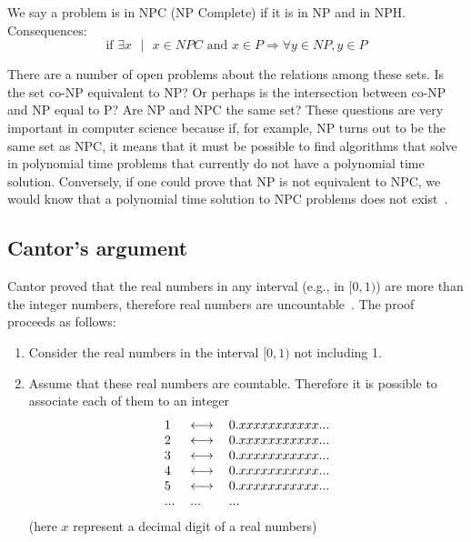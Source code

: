 \documentclass[justified,sixbynine]{tufte-book}
\theoremstyle{plain}%
\theoremstyle{definition}
\theoremstyle{remark}
\begin{document}
\begin{fullwidth}
We say a problem is in NPC (NP Complete) if it is in NP and in NPH.
Consequences:
\begin{equation}
\text{if }\exists x\text{ }|\text{ }x\in NPC\text{ and }x\in P\Rightarrow
\forall y\in NP,y\in P
\end{equation}

There are a number of open problems about the relations among these sets.
Is the set co-NP equivalent to NP? Or perhaps is the intersection between co-NP and NP equal to P?
Are NP and NPC the same set? These questions are very important in computer science because if, for example, NP turns out to be the same set as NPC, it means that it must be possible to find algorithms that solve in polynomial time problems that currently do not have a polynomial time solution. Conversely, if one could prove that NP is not equivalent to NPC, we would know that a polynomial time solution to NPC problems does not exist~\cite{pnp}.

\subsection{Cantor's argument}


Cantor proved that the real numbers in any interval (e.g., in $[0,1)$)
are more than the integer numbers, therefore real numbers are uncountable~\cite{hofstadter}.
The proof proceeds as follows:

\begin{enumerate}
\item  Consider the real numbers in the interval $[0,1)$ not including 1$.$

\item  Assume that these real numbers are countable. Therefore it is
possible to associate each of them to an integer
\begin{equation}
\begin{tabular}{lll}
1 & $\longleftrightarrow $ & $0.xxxxxxxxxxx...$ \\
2 & $\longleftrightarrow $ & $0.xxxxxxxxxxx...$ \\
3 & $\longleftrightarrow $ & $0.xxxxxxxxxxx...$ \\
4 & $\longleftrightarrow $ & $0.xxxxxxxxxxx...$ \\
5 & $\longleftrightarrow $ & $0.xxxxxxxxxxx...$ \\
... & ... & ...
\end{tabular}
\label{cantor}
\end{equation}
(here $x$ represent a decimal digit of a real numbers)


\end{enumerate}
\end{fullwidth}
\end{document}
